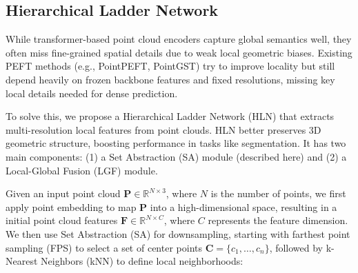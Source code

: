 \subsection{Hierarchical Ladder Network}
\label{sec:HLN}


While transformer-based point cloud encoders capture global semantics well, they often miss fine-grained spatial details due to weak local geometric biases. Existing PEFT methods (e.g., PointPEFT, PointGST) try to improve locality but still depend heavily on frozen backbone features and fixed resolutions, missing key local details needed for dense prediction.

To solve this, we propose a Hierarchical Ladder Network (HLN) that extracts multi-resolution local features from point clouds. HLN better preserves 3D geometric structure, boosting performance in tasks like segmentation. It has two main components: (1) a Set Abstraction (SA) module (described here) and (2) a Local-Global Fusion (LGF) module.


Given an input point cloud $\mathbf{P} \in \mathbb{R}^{N \times 3}$, where $N$ is the number of points, we first apply point embedding to map $\mathbf{P}$ into a high-dimensional space, resulting in a initial point cloud features $\mathbf{F} \in \mathbb{R}^{N \times C}$, where $C$ represents the feature dimension. We then use Set Abstraction (SA) for downsampling, starting with farthest point sampling (FPS) to select a set of center points $\mathbf{C}=\{c_1, \ldots, c_n\}$, followed by k-Nearest Neighbors (kNN) to define local neighborhoods: 

